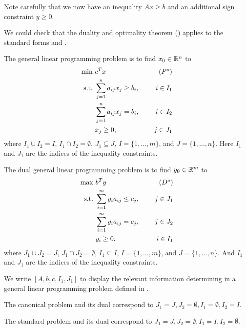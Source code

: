 \begin{remark}
Note carefully that we now have an inequality $Ax \ge b$ and an additional sign constraint $y \ge 0$.
\end{remark}

\begin{remark}
We could check that the duality and optimality theorem () applies to the standard forms  and .
\end{remark}

\begin{definition}
The general linear programming problem is to find $x_0 \in \mathbb{R}^n$ to
\begin{align}
\min \ & c^T x & \tag{$P^o$} \labeq{LP_Po} \\
\st    & \sum_{j=1}^{n} a_{ij} x_j \ge b_i, & i \in I_1 \nonumber \\
       & \sum_{j=1}^{n} a_{ij} x_j = b_i, & i \in I_2 \nonumber \\
       & x_j \ge 0, & j \in J_1 \nonumber
\end{align}
where $I_1 \cup I_2 = I$, $I_1 \cap I_2 = \emptyset$, $J_1 \subseteq J$, $I = \{ 1, \dots, m \}$, and $J=\{ 1, \dots, n \}$.
Here $I_1$ and $J_1$ are the indices of the inequality constraints.
\end{definition}

\begin{definition}
The dual general linear programming problem is to find $y_0 \in \mathbb{R}^m$ to
\begin{align}
\max \ & b^T y & \tag{$D^o$} \labeq{LP_Do} \\
\st & \sum_{i=1}^{m} y_i a_{ij} \le c_j, & j \in J_1 \nonumber \\
    & \sum_{i=1}^{m} y_i a_{ij} = c_j, & j \in J_2 \nonumber \\
    & y_i \ge 0, & i \in I_1 \nonumber
\end{align}
where $J_1 \cup J_2 = J$, $J_1 \cap J_2 = \emptyset$, $I_1 \subseteq I$, $I = \{ 1, \dots, m \}$, and $J=\{ 1, \dots, n \}$.
And $I_1$ and $J_1$ are the indices of the inequality constraints.
\end{definition}

\begin{remark}
We write $[A, b, c, I_1, J_1]$ to display the relevant information determining in a general linear programming problem  defined in .

The canonical problem  and its dual  
correspond to $J_1 = J, J_2 = \emptyset, I_1 = \emptyset, I_2 = I$.

The standard problem  and its dual  correspond to $J_1 = J, J_2 = \emptyset, I_1 = I, I_2 = \emptyset$.
\end{remark}

